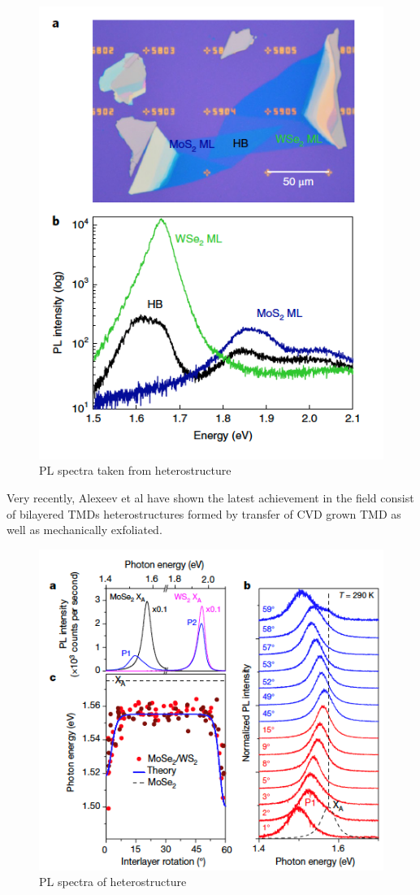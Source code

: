 \begin{figure}[h]
	\begin{center}
		\includegraphics[scale=1]{Heterostructures/HeterostructurePLSpectrumInterlayerIntro.png}
		\caption{PL spectra taken from heterostructure \cite{Kunstmann2018}}
		\label{fig:HeterostructurePLSpectrumInterlayerIntro}
	\end{center}
\end{figure}

Very recently, Alexeev et al \cite{Alexeev2019} have shown the latest achievement in the field consist of bilayered TMDs heterostructures formed by transfer of CVD grown TMD as well as mechanically exfoliated.

\begin{figure}[h]
	\begin{center}
		\includegraphics[scale=1]{Heterostructures/HeterostructurePLSpectrumInterlayerTwist.png}
		\caption{PL spectra of heterostructure \cite{Alexeev2019}}
		\label{fig:HeterostructurePLSpectrumInterlayerTwist}
	\end{center}
\end{figure}